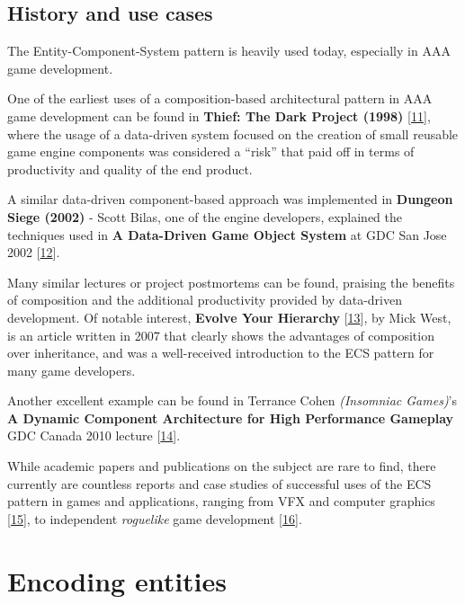 \documentclass[twoside, 12pt, a4paper, openany]{book}
\begin{document}
\section{History and use cases}\label{history-and-use-cases}

The Entity-Component-System pattern is heavily used today, especially in
AAA game development.

One of the earliest uses of a composition-based architectural pattern in
AAA game development can be found in \textbf{Thief: The Dark Project
(1998)}
{[}\protect\hyperlink{ref-tomleonard_thiefpostmortem_1999}{11}{]}, where
the usage of a data-driven system focused on the creation of small
reusable game engine components was considered a ``risk'' that paid off
in terms of productivity and quality of the end product.

A similar data-driven component-based approach was implemented in
\textbf{Dungeon Siege (2002)} - Scott Bilas, one of the engine
developers, explained the techniques used in \textbf{A Data-Driven Game
Object System} at GDC San Jose 2002
{[}\protect\hyperlink{ref-scottbilas_dungeonsiege_2002}{12}{]}.

Many similar lectures or project postmortems can be found, praising the
benefits of composition and the additional productivity provided by
data-driven development. Of notable interest, \textbf{Evolve Your
Hierarchy}
{[}\protect\hyperlink{ref-mickwest_evolveyourhierarchy_2007}{13}{]}, by
Mick West, is an article written in 2007 that clearly shows the
advantages of composition over inheritance, and was a well-received
introduction to the ECS pattern for many game developers.

Another excellent example can be found in Terrance Cohen
\emph{(Insomniac Games)}'s \textbf{A Dynamic Component Architecture for
High Performance Gameplay} GDC Canada 2010 lecture
{[}\protect\hyperlink{ref-terrancecohen_dynamiccomparchitecture_2010}{14}{]}.

While academic papers and publications on the subject are rare to find,
there currently are countless reports and case studies of successful
uses of the ECS pattern in games and applications, ranging from VFX and
computer graphics
{[}\protect\hyperlink{ref-stackexchange_ixe_answer}{15}{]}, to
independent \emph{roguelike} game development
{[}\protect\hyperlink{ref-sproggiwood_irdc_2015_talk}{16}{]}.

\hypertarget{chapter_encoding_entities}{\chapter{Encoding
entities}\label{chapter_encoding_entities}}
\end{document}
